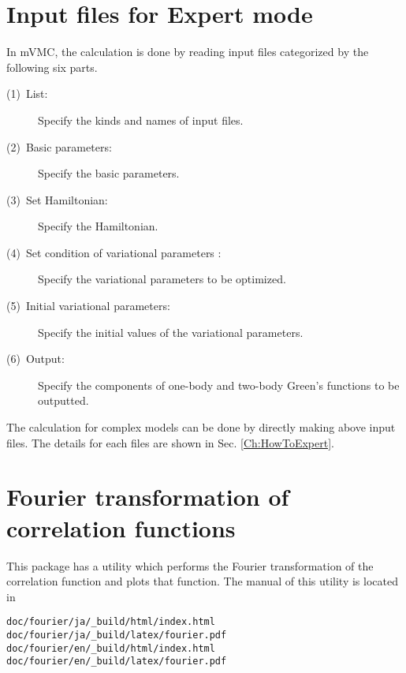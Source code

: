 \section{Input files for Expert mode}

In mVMC, the calculation is done by reading input files categorized by the following six parts. 
\begin{description}
\item[(1)~List:] Specify the kinds and names of input files. 
\item[(2)~Basic parameters:] Specify the basic parameters.
\item[(3)~Set Hamiltonian:] Specify the Hamiltonian.
\item[(4)~Set condition of variational parameters :] Specify the variational parameters to be optimized.
\item[(5)~Initial variational parameters:] Specify the initial values of the variational parameters.
\item[(6)~Output:] Specify the components of one-body and two-body Green's functions to be outputted.
\end{description}

The calculation for complex models can be done by directly making above input files. 
The details for each files are shown in Sec. \ref{Ch:HowToExpert}.

\section{Fourier transformation of correlation functions}

This package has a utility which performs the Fourier transformation of the correlation function and plots that function.
The manual of this utility is located in
\begin{verbatim}
doc/fourier/ja/_build/html/index.html
doc/fourier/ja/_build/latex/fourier.pdf
doc/fourier/en/_build/html/index.html
doc/fourier/en/_build/latex/fourier.pdf
\end{verbatim}
